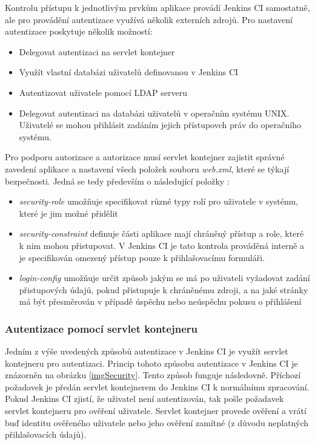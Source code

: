             Kontrolu přístupu k jednotlivým prvkům aplikace provádí 
            Jenkins CI samostatně, ale pro provádění autentizace využívá několik externích zdrojů. Pro nastavení autentizace
            poskytuje několik možností:

            \begin{itemize}
                \item Delegovat autentizaci na servlet kontejner
                \item Využít vlastní databázi uživatelů definovanou v Jenkins CI
                \item Autentizovat uživatele pomocí LDAP serveru
                \item Delegovat autentizaci na databázi uživatelů v operačním systému UNIX. Uživatelé 
                    se mohou přihlásit zadáním jejich přístupovch práv do operačního systému. 
            \end{itemize}
            
            Pro podporu autorizace a autorizace musí servlet kontejner zajistit správné zavedení aplikace a nastavení
            všech položek souboru \emph{web.xml}, které se týkají bezpečnosti. Jedná se tedy především
            o následující položky \cite{webXml}:

            \begin{itemize}
                \item \emph{security-role} umožňuje specifikovat různé typy rolí pro uživatele v systému,
                    které je jim možné přidělit
                \item \emph{security-constraint} definuje části aplikace mají chráněný přístup a role, které k nim
                    mohou přistupovat. V Jenkins CI je tato kontrola prováděná interně a je specifikován
                    omezený přístup pouze k přihlašovacímu formuláři.
                \item \emph{login-config} umožňuje určit způsob jakým se má po uživateli vyžadovat zadání přistupových
                    údajů, pokud přistupuje k chráněnému zdroji, a na jaké stránky má být přesměrován v případě úspěchu
                    nebo neúspěchu pokusu o přihlášení
            \end{itemize}
            
    
            \subsubsection{Autentizace pomocí servlet kontejneru}
                Jedním z výše uvedených způsobů autentizace v Jenkins CI je využít servlet kontejneru pro autentizaci.
                Princip tohoto způsobu autentizace v Jenkins CI je znázorněn na obrázku \ref{imgSecurity}. 
                Tento způsob funguje následovně. Příchozí 
                požadavek je předán servlet kontejnerem do Jenkins CI k normálnímu zpracování. 
                Pokud Jenkins CI zjistí, že uživatel
                není autentizován, tak pošle požadavek servlet kontejneru pro ověření uživatele. Servlet
                kontejner provede ověření a vrátí buď identitu ověřeného uživatele nebo jeho ověření zamítné (z důvodu
                neplatných přihlašovacích údajů).
                
